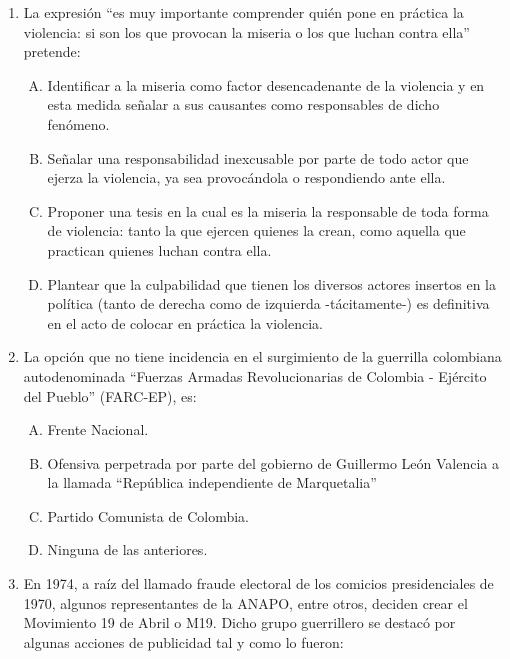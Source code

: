 \begin{enumerate}


\item  La expresión ``es muy importante comprender quién pone en práctica la violencia: si son los que provocan la miseria o los que luchan contra ella'' pretende:\label{sociii-8}


\begin{enumerate}[(A)]
\item   Identificar a la miseria como factor desencadenante de la violencia y en esta medida señalar a sus causantes como responsables de dicho fenómeno.
 \item  Señalar una responsabilidad inexcusable por parte de todo actor que ejerza la violencia, ya sea provocándola o respondiendo ante ella.
\item Proponer una  tesis en la cual es la miseria la responsable de toda forma de violencia: tanto la que ejercen quienes la crean, como aquella que practican quienes luchan contra ella.
\item Plantear que la culpabilidad que tienen los diversos actores insertos en la política (tanto de derecha como de izquierda -tácitamente-) es definitiva en el acto de colocar en práctica la violencia.  
\end{enumerate}


\newpage
\item La opción que no tiene incidencia en el surgimiento de la guerrilla colombiana autodenominada ``Fuerzas Armadas Revolucionarias de Colombia - Ejército del Pueblo'' (FARC-EP), es:\label{sociii-9}


\begin{enumerate}[(A)]
\item   Frente Nacional.
 \item  Ofensiva perpetrada por parte del gobierno de Guillermo León Valencia a la llamada ``República independiente de Marquetalia''
\item Partido Comunista de Colombia.
\item Ninguna de las anteriores.
\end{enumerate}



\item En 1974, a raíz del llamado fraude electoral de los comicios presidenciales de 1970, algunos representantes de la ANAPO, entre otros, deciden crear el Movimiento 19 de Abril o M19. Dicho grupo guerrillero se destacó por algunas acciones de publicidad tal y como lo fueron:\label{sociii-10}



\end{enumerate}
